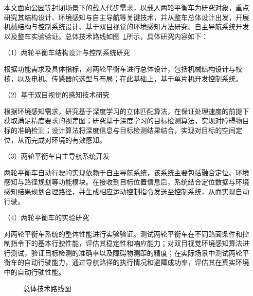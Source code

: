 本文面向公园等封闭场景下的载人代步需求，以载人两轮平衡车为研究对象，重点研究其结构设计、环境感知与自主导航等关键技术，并从整车总体设计出发，开展机械结构与控制系统设计、基于双目视觉的环境感知方法研究、自主导航系统开发以及整车实验验证。总体技术路线如图~\ref{fig:总体技术路线图}所示，具体研究内容如下：

（1）两轮平衡车结构设计与控制系统研究

根据功能需求及具体指标，对两轮平衡车进行总体设计，包括机械结构设计与校核，以及电机、传感器的选型与布局；在此基础上，基于单片机开发控制系统。

（2）基于双目视觉的感知技术研究

根据环境感知需求，研究基于深度学习的立体匹配算法，在保证处理速度的前提下获取满足精度要求的视差图；研究基于深度学习的目标检测算法，实现对障碍物目标的准确检测；设计算法将深度信息与目标检测结果结合，实现对目标的空间定位，从而完成对环境的有效感知。

（3）两轮平衡车自主导航系统开发

两轮平衡车自动行驶的实现依赖于自主导航系统，该系统主要包括融合定位、环境感知与路径规划等功能模块。在接收到目标位置信息后，系统结合定位数据与环境感知结果规划合理路径，并生成相应运动控制指令发送至控制系统，从而实现自动行驶。

（4）两轮平衡车的实验研究

对两轮平衡车系统的整体性能进行实验验证。测试两轮平衡车在不同路面条件和控制指令下的基本行驶性能，评估其稳定性和响应能力；对双目视觉环境感知算法进行测试，验证目标检测的准确率以及障碍物测距的精度；在实际场景中测试两轮平衡车的自动行驶能力，通过导航路径的执行情况和避障成功率，评估其在真实环境中的自动行驶性能。

\begin{figure}[ht]
  \centering
  
  \caption{总体技术路线图}
  \label{fig:总体技术路线图}
\end{figure}
\FloatBarrier
